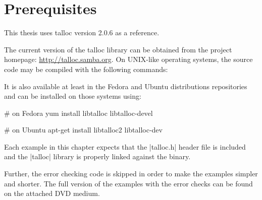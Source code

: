 \section{Prerequisites}
\label{talloc:prerequisites}

This thesis uses talloc version 2.0.6 as a reference.

\funclistend
The current version of the talloc library can be obtained from the project
homepage:
{\footnotesize\url{http://talloc.samba.org}}. On UNIX-like operating systems,
the source code may be compiled with the following commands:

\funclistend
It is also available at least in the Fedora and Ubuntu distributions
repositories and can be installed on those systems using:

\begin{commandline}
# on Fedora
yum install libtalloc libtalloc-devel

# on Ubuntu
apt-get install libtalloc2 libtalloc-dev
\end{commandline}
\funclistend
Each example in this chapter expects that the |talloc.h| header file is included
and the |talloc| library is properly linked against the binary.

Further, the error checking code is skipped in order to make the examples
simpler and shorter. The full version of the examples with the error checks can
be found on the attached DVD medium.


